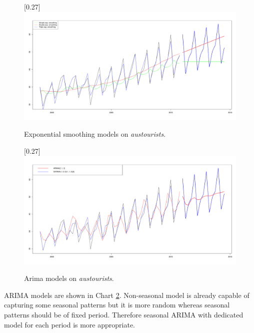     \begin{figure}[H]
        \begin{center}
            \scalebox{0.255}[0.27]{\includegraphics{img/exp-smoothings.pdf}}
            \caption{Exponential smoothing models on \emph{austourists}.}
            \label{img:exp-smoothings}
        \end{center}
    \end{figure}

    \begin{figure}[H]
        \begin{center}
            \scalebox{0.255}[0.27]{\includegraphics{img/arima-sarima.pdf}}
            \caption{Arima models on \emph{austourists}.}
            \label{img:arimas}
        \end{center}
    \end{figure}

    ARIMA models are shown in Chart \ref{img:arimas}. Non-seasonal model is already capable of capturing some seasonal
    patterns but it is more random whereas seasonal patterns should be of fixed period. Therefore seasonal ARIMA with
    dedicated model for each period is more appropriate.


